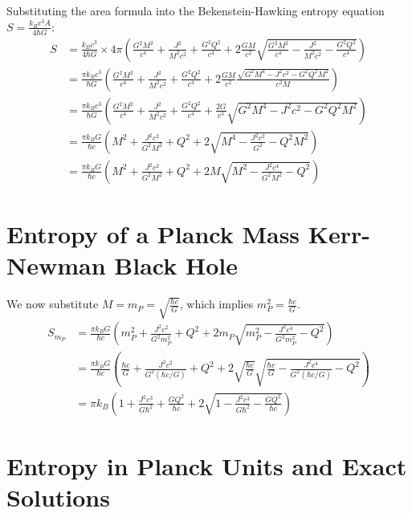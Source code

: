	Substituting the area formula into the Bekenstein-Hawking entropy equation $S = \frac{k_B c^3 A}{4 \hbar G}$:
	\begin{align*}
		S &= \frac{k_B c^3}{4 \hbar G} \times 4 \pi \left( \frac{G^2 M^2}{c^4} + \frac{J^2}{M^2 c^2} + \frac{G^2 Q^2}{c^4} + 2 \frac{G M}{c^2} \sqrt{\frac{G^2 M^2}{c^4} - \frac{J^2}{M^2 c^2} - \frac{G^2 Q^2}{c^4}} \right) \\
		&= \frac{\pi k_B c^3}{\hbar G} \left( \frac{G^2 M^2}{c^4} + \frac{J^2}{M^2 c^2} + \frac{G^2 Q^2}{c^4} + 2 \frac{G M}{c^2} \frac{\sqrt{G^2 M^4 - J^2 c^2 - G^2 Q^2 M^2}}{c^2 M} \right) \\
		&= \frac{\pi k_B c^3}{\hbar G} \left( \frac{G^2 M^2}{c^4} + \frac{J^2}{M^2 c^2} + \frac{G^2 Q^2}{c^4} + \frac{2 G}{c^3} \sqrt{G^2 M^4 - J^2 c^2 - G^2 Q^2 M^2} \right) \\
		&= \frac{\pi k_B G}{\hbar c} \left( M^2 + \frac{J^2 c^2}{G^2 M^2} + Q^2 + 2 \sqrt{M^4 - \frac{J^2 c^2}{G^2} - Q^2 M^2} \right) \\
		&= \frac{\pi k_B G}{\hbar c} \left( M^2 + \frac{J^2 c^2}{G^2 M^2} + Q^2 + 2 M \sqrt{M^2 - \frac{J^2 c^4}{G^2 M^2} - Q^2} \right)
	\end{align*}
	
	\section{Entropy of a Planck Mass Kerr-Newman Black Hole}
	
	We now substitute $M = m_P = \sqrt{\frac{\hbar c}{G}}$, which implies $m_P^2 = \frac{\hbar c}{G}$.
	\begin{align*}
		S_{m_P} &= \frac{\pi k_B G}{\hbar c} \left( m_P^2 + \frac{J^2 c^2}{G^2 m_P^2} + Q^2 + 2 m_P \sqrt{m_P^2 - \frac{J^2 c^4}{G^2 m_P^2} - Q^2} \right) \\
		&= \frac{\pi k_B G}{\hbar c} \left( \frac{\hbar c}{G} + \frac{J^2 c^2}{G^2 (\hbar c / G)} + Q^2 + 2 \sqrt{\frac{\hbar c}{G}} \sqrt{\frac{\hbar c}{G} - \frac{J^2 c^4}{G^2 (\hbar c / G)} - Q^2} \right) \\
		&= \pi k_B \left( 1 + \frac{J^2 c^3}{G \hbar^2} + \frac{G Q^2}{\hbar c} + 2 \sqrt{1 - \frac{J^2 c^3}{G \hbar^2} - \frac{G Q^2}{\hbar c}} \right)
	\end{align*}
	
	\section{Entropy in Planck Units and Exact Solutions}
	
